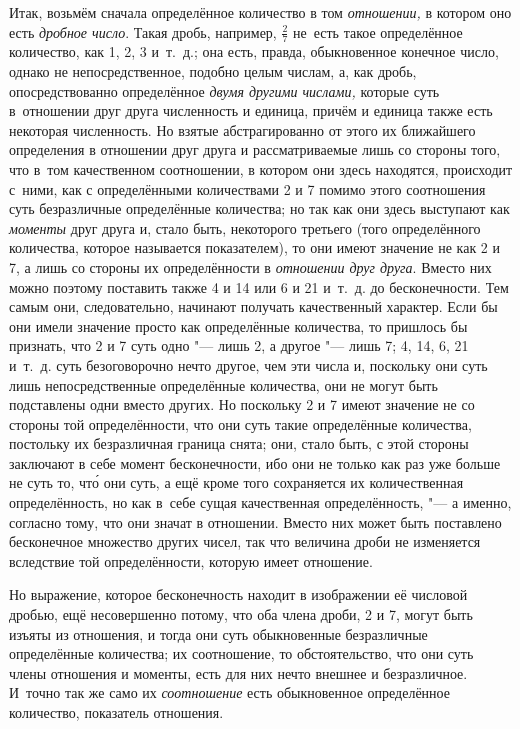Итак, возьмём сначала определённое количество в том {\em отношении,} в котором
оно есть {\em дробное число}. Такая дробь, например, $\frac 2 7$ не~есть такое
определённое количество, как 1, 2, 3 и~т.~д.; она есть, правда, обыкновенное
конечное число, однако не непосредственное, подобно целым числам, а, как дробь,
опосредствованно определённое {\em двумя другими числами,} которые суть
в~отношении друг друга численность и единица, причём и единица также есть
некоторая численность. Но взятые абстрагированно от этого их ближайшего
определения в отношении друг друга и рассматриваемые лишь со стороны того,
что в~том качественном соотношении, в котором они здесь находятся, происходит
с~ними, как с определёнными количествами 2 и 7 помимо этого соотношения суть
безразличные определённые количества; но так как они здесь выступают как
{\em моменты} друг друга и, стало быть, некоторого третьего (того определённого
количества, которое называется показателем), то они имеют значение не как 2 и
7, а лишь со стороны их определённости в {\em отношении друг друга}. Вместо них
можно поэтому поставить также 4 и 14 или 6 и 21 и~т.~д. до бесконечности. Тем
самым они, следовательно, начинают получать качественный характер. Если бы они
имели значение просто как определённые количества, то пришлось бы признать, что
2 и 7 суть одно "--- лишь 2, а другое "--- лишь 7; 4, 14, 6, 21 и~т.~д. суть
безоговорочно нечто другое, чем эти числа и, поскольку они суть лишь
непосредственные определённые количества, они не могут быть подставлены одни
вместо других. Но поскольку 2 и 7 имеют значение не со стороны той
определённости, что они суть такие определённые количества, постольку их
безразличная граница снята; они, стало быть, с этой стороны заключают в себе
момент бесконечности, ибо они не только как раз уже больше не суть то, чт\'{о}
они суть, а ещё кроме того сохраняется их количественная определённость, но как
в~себе сущая качественная определённость, "--- а именно, согласно тому, что они
значат в отношении. Вместо них может быть поставлено бесконечное множество
других чисел, так что величина дроби не изменяется вследствие той
определённости, которую имеет отношение.

Но выражение, которое бесконечность находит в изображении её числовой дробью,
ещё несовершенно потому, что оба члена дроби, 2 и 7, могут быть изъяты из
отношения, и тогда они суть обыкновенные безразличные определённые количества;
их соотношение, то обстоятельство, что они суть члены отношения и моменты, есть
для них нечто внешнее и безразличное. И~точно так же само их {\em соотношение}
есть обыкновенное определённое количество, показатель отношения.


